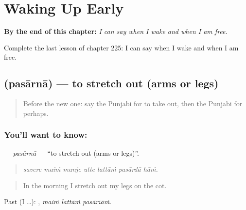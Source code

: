 
\chapter{Waking Up Early}
\label{ch:pa-a2-waking-up-early}

\begin{chapteropening}
\textbf{By the end of this chapter:} \emph{I can say when I wake and when I am free.}

Complete the last lesson of chapter 225: I can say when I wake and when I am free.
\end{chapteropening}

\section[\texorpdfstring{\pa{ਪਸਾਰਨਾ} (pasārnā)}{ਪਸਾਰਨਾ (pasārnā)}]{ (pasārnā) — to stretch out (arms or legs)}

\label{lesson:PA-C225-pasarna}



\begin{quote}
Before the new one: say the Punjabi for to take out, then the Punjabi for perhaps.
\end{quote}

\subsection*{You'll want to know: }
\textbf{} — \emph{pasārnā} — \textquotedblleft{}to stretch out (arms or legs)\textquotedblright{}.

\begin{quote}
      
\end{quote}

\begin{quote}
\emph{savere maiṁ manje utte lattāṁ pasārdā hāṁ.}
\end{quote}

\begin{quote}
In the morning I stretch out my legs on the cot.
\end{quote}

Past (I …):   , \emph{maiṁ lattāṁ pasārīāṁ}.

